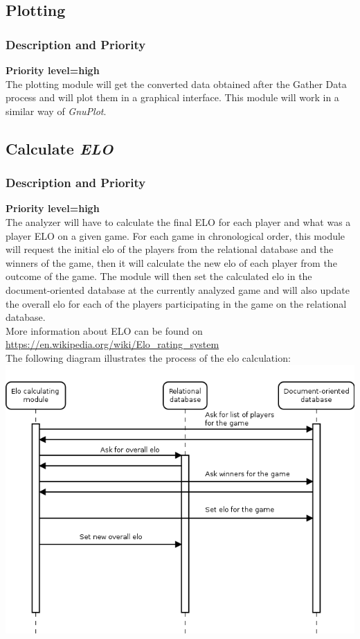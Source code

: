 \documentclass{scrreprt}
\begin{document}
\subsection{Plotting}
\subsubsection{Description and Priority}
\textbf{Priority level=high}\\
The plotting module will get the converted data obtained after the Gather Data process and will plot them in a graphical interface. This module will work in a similar way of \textit{GnuPlot}.

\subsection{Calculate \textit{\textbf{ELO}}}
\subsubsection{Description and Priority}
\textbf{Priority level=high}\\
The analyzer will have to calculate the final ELO for each player and what was a
player ELO on a given game.
For each game in chronological order, this module will request the initial elo of the players from the relational database and the winners of the game, then it will calculate the new elo of each player from the outcome of the game. The module will then set the calculated elo in the document-oriented database at the currently analyzed game and will also update the overall elo for each of the players participating in the game on the relational database.\\
More information about ELO can be found on \url{https://en.wikipedia.org/wiki/Elo_rating_system}\\
The following diagram illustrates the process of the elo calculation:\\
\includegraphics[width=\textwidth,height=\textheight,keepaspectratio]{elocalc}\\
\end{document}
